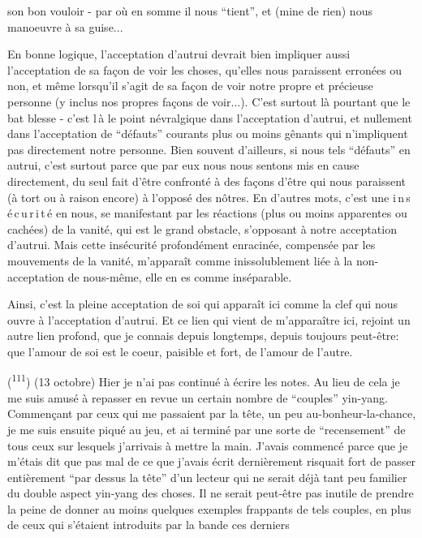 
son bon vouloir - par où en somme il nous ``tient'', et (mine de rien) nous manoeuvre à sa guise...

En bonne logique, l'acceptation d'autrui devrait bien impliquer aussi l'acceptation de sa façon de voir les choses, qu'elles nous paraissent erronées ou non, et même lorsqu'il s'agit de sa façon de voir notre propre et précieuse personne (y inclus nos propres façons de voir...). C'est surtout là pourtant que le bat blesse - c'est l\,à le point névralgique dans l'acceptation d'autrui, et nullement dans l'acceptation de ``défauts'' courants plus ou moins gênants qui n'impliquent pas directement notre personne. Bien souvent d'ailleurs, si nous  tels ``défauts'' en autrui, c'est surtout parce que par eux nous nous sentons mis en cause directement, du seul fait d'être confronté à des façons d'être qui nous paraissent (à tort ou à raison encore) à l'opposé des nôtres. En d'autres mots, c'est une i\,n\,s\,é\,c\,u\,r\,i\,t\,é en nous, se manifestant par les réactions (plus ou moins apparentes ou cachées) de la vanité, qui est le grand obstacle, s'opposant à notre acceptation d'autrui. Mais cette insécurité profondément enracinée, compensée par les mouvements de la vanité, m'apparaît comme inissolublement liée à la non-acceptation de nous-même, elle en es comme  inséparable.

Ainsi, c'est la pleine acceptation de soi qui apparaît ici comme la clef qui nous ouvre à l'acceptation d'autrui. Et ce lien qui vient de m'apparaître ici, rejoint un autre lien profond, que je connais depuis longtemps, depuis toujours peut-être: que l'amour de soi est le coeur, paisible et fort, de l'amour de l'autre.

(\textsuperscript{111}) (13 octobre) Hier je n'ai pas continué à écrire les notes. Au lieu de cela je me suis amusé à repasser en revue un certain nombre de ``couples'' yin-yang. Commençant par ceux qui me passaient par la tête, un peu au-bonheur-la-chance, je me suis ensuite piqué au jeu, et ai terminé par une sorte de ``recensement'' de tous ceux sur lesquels j'arrivais à mettre la main. J'avais commencé parce que je m'étais dit que pas mal de ce que j'avais écrit dernièrement risquait fort de passer entièrement ``par dessus la tête'' d'un lecteur qui ne serait déjà tant  peu familier du double aspect yin-yang des choses. Il ne serait peut-être pas inutile de prendre la peine de donner au moins quelques exemples frappants de tels couples, en plus de ceux qui s'étaient introduits par la bande ces derniers
